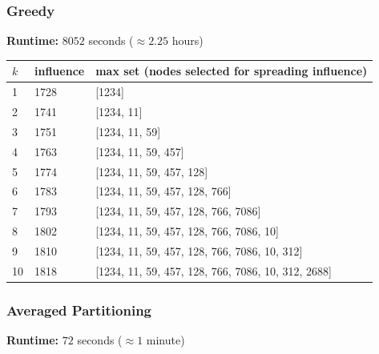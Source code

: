 \documentclass{article}
\begin{document}
    \pagebreak
    \subsubsection{Greedy}
      
      \textbf{Runtime:} $8052$ seconds ($\approx 2.25$ hours)

      \begin{center}
        \begin{tabular}{|lll|}
          \hline
          $k$ & influence & max set (nodes selected for spreading influence) \\
          \hline
          1  & 1728 & [1234] \\
          2  & 1741 & [1234, 11] \\
          3  & 1751 & [1234, 11, 59] \\
          4  & 1763 & [1234, 11, 59, 457] \\
          5  & 1774 & [1234, 11, 59, 457, 128] \\
          6  & 1783 & [1234, 11, 59, 457, 128, 766] \\
          7  & 1793 & [1234, 11, 59, 457, 128, 766, 7086] \\
          8  & 1802 & [1234, 11, 59, 457, 128, 766, 7086, 10] \\
          9  & 1810 & [1234, 11, 59, 457, 128, 766, 7086, 10, 312] \\
          10 & 1818 & [1234, 11, 59, 457, 128, 766, 7086, 10, 312, 2688] \\
          \hline
        \end{tabular}
      \end{center}
    
    \subsubsection{Averaged Partitioning}
      
      \textbf{Runtime:} $72$ seconds ($\approx 1$ minute)
\end{document}
